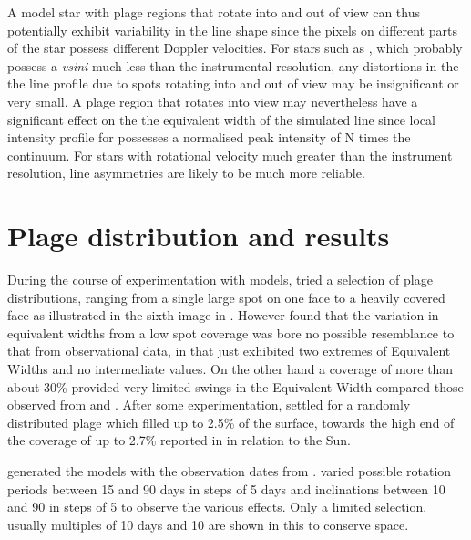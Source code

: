 A model star with plage regions that rotate into and out of view can thus potentially exhibit variability in the line
shape since the pixels on different parts of the star possess different Doppler velocities. For stars such as \prox,
which probably possess a \textit{vsini} much less than the instrumental resolution, any distortions in the the line
profile due to spots rotating into and out of view may be insignificant or very small. A plage region that rotates into
view may nevertheless have a significant effect on the the equivalent width of the simulated line since {\Firstposs}
local intensity profile for {\ha} possesses a normalised peak intensity of N times the continuum. For stars with
rotational velocity much greater than the instrument resolution, line asymmetries are likely to be much more reliable.

\section{Plage distribution and results}
During the course of experimentation with models, {\Firstp} tried a selection of plage distributions, ranging from a
single large spot on one face to a heavily covered face as illustrated in the sixth image in
\citet[Fig. 1]{barnes11}. However {\Firstp} found that the variation in equivalent widths from a low spot coverage was
bore no possible resemblance to that from observational data, in that just exhibited two extremes of Equivalent Widths
and no intermediate values. On the other hand a coverage of more than about 30\% provided very limited swings in the
Equivalent Width compared those observed from {\harps} and {\uves}. After some experimentation, {\Firstp} settled for a
randomly distributed plage which filled up to 2.5\% of the surface, towards the high end of the coverage of up to 2.7\%
reported in \citet{guttenbrunner14} in relation to the Sun.

{\FirstP} generated the models with the observation dates from {\harps}. {\FirstP} varied possible rotation periods
between 15 and 90 days in steps of 5 days and inclinations between 10{\degree} and 90{\degree} in steps of 5{\degree} to
observe the various effects. Only a limited selection, usually multiples of 10 days and 10{\degree} are shown in this
{\paperorthesis} to conserve space.


